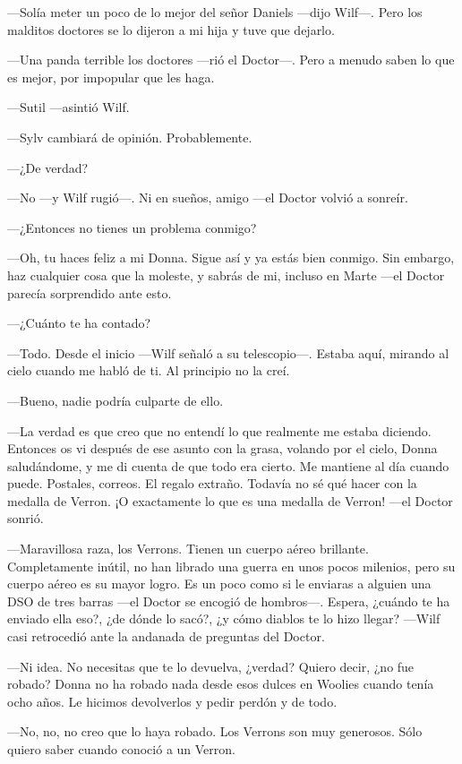 ---Solía meter un poco de lo mejor del señor Daniels ---dijo Wilf---.
Pero los malditos doctores se lo dijeron a mi hija y tuve que dejarlo.

---Una panda terrible los doctores ---rió el Doctor---. Pero a menudo
saben lo que es mejor, por impopular que les haga.

---Sutil ---asintió Wilf.

---Sylv cambiará de opinión. Probablemente.

---¿De verdad?

---No ---y Wilf rugió---. Ni en sueños, amigo ---el Doctor volvió a
sonreír.

---¿Entonces no tienes un problema conmigo?

---Oh, tu haces feliz a mi Donna. Sigue así y ya estás bien conmigo. Sin
embargo, haz cualquier cosa que la moleste, y sabrás de mi, incluso en
Marte ---el Doctor parecía sorprendido ante esto.

---¿Cuánto te ha contado?

---Todo. Desde el inicio ---Wilf señaló a su telescopio---. Estaba aquí,
mirando al cielo cuando me habló de ti. Al principio no la creí.

---Bueno, nadie podría culparte de ello.

---La verdad es que creo que no entendí lo que realmente me estaba
diciendo. Entonces os vi después de ese asunto con la grasa, volando por
el cielo, Donna saludándome, y me di cuenta de que todo era cierto. Me
mantiene al día cuando puede. Postales, correos. El regalo extraño.
Todavía no sé qué hacer con la medalla de Verron. ¡O exactamente lo que
es una medalla de Verron! ---el Doctor sonrió.

---Maravillosa raza, los Verrons. Tienen un cuerpo aéreo brillante.
Completamente inútil, no han librado una guerra en unos pocos milenios,
pero su cuerpo aéreo es su mayor logro. Es un poco como si le enviaras a
alguien una DSO de tres barras ---el Doctor se encogió de hombros---.
Espera, ¿cuándo te ha enviado ella eso?, ¿de dónde lo sacó?, ¿y cómo
diablos te lo hizo llegar? ---Wilf casi retrocedió ante la andanada de
preguntas del Doctor.

---Ni idea. No necesitas que te lo devuelva, ¿verdad? Quiero decir, ¿no
fue robado? Donna no ha robado nada desde esos dulces en Woolies cuando
tenía ocho años. Le hicimos devolverlos y pedir perdón y de todo.

---No, no, no creo que lo haya robado. Los Verrons son muy generosos.
Sólo quiero saber cuando conoció a un Verron.

